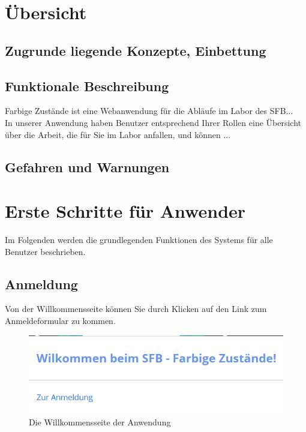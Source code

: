 \documentclass[enabledeprecatedfontcommands,fontsize=12pt,paper=a4,twoside]{scrartcl}
\begin{document}
\newpage
\section{Übersicht}
\subsection{Zugrunde liegende Konzepte, Einbettung}
\subsection{Funktionale Beschreibung}
Farbige Zustände ist eine Webanwendung für die Abläufe im Labor des SFB...\\
In unserer Anwendung haben Benutzer entsprechend Ihrer Rollen eine Übersicht über die Arbeit, die für Sie im Labor anfallen, und können ... \\
\subsection{Gefahren und Warnungen}


\newpage
\section{Erste Schritte für Anwender}

Im Folgenden werden die grundlegenden Funktionen des Systems für alle Benutzer beschrieben. \\

\subsection{Anmeldung}
Von der Willkommensseite können Sie durch Klicken auf den Link zum Anmeldeformular zu kommen. \\

\begin{figure}[h!]
\begin{center}
 \includegraphics[width=\textwidth]{screenshots/allgemein/willkommen.png}
  \caption{Die Willkommensseite der Anwendung}
  \label{fig:boat1}
\end{center}
\end{figure}
\end{document}
